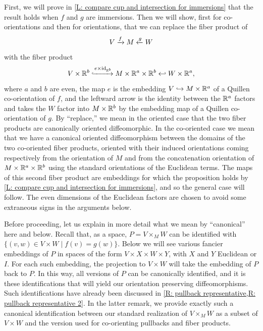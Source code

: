 First, we will prove in \cref{L: compare cup and intersection for immersions} that the result holds when $f$ and $g$ are immersions.
Then we will show, first for co-orientations and then for orientations, that we can replace the fiber product of
$$V \xrightarrow{f} M \xleftarrow{g} W$$
with the fiber product
$$V \times \mathbb{R}^b \xhookrightarrow{e \times \mathrm{id}_{\mathbb{R}^b }} M \times \mathbb{R}^a \times \mathbb{R}^b \hookleftarrow W \times \mathbb{R}^a ,$$
where $a$ and $b$ are even, the map $e$ is the embedding $V \hookrightarrow M \times \mathbb{R}^a $ of a Quillen co-orientation of $f$, and the leftward arrow is the identity between the $\mathbb{R}^a $ factors and takes the $W$ factor into $M \times \mathbb{R}^b $ by the embedding map of a Quillen co-orientation of $g$.
By ``replace,'' we mean in the oriented case that the two fiber products are canonically oriented diffeomorphic.
In the co-oriented case we mean that we have a canonical oriented diffeomorphism
between the domains of the two co-oriented fiber products, oriented with their induced orientations coming respectively from the orientation of $M$ and from the concatenation orientation of $M \times \mathbb{R}^a \times \mathbb{R}^b $ using the standard orientations of the Euclidean terms.
The maps of this second fiber product are embeddings for which the proposition holds by \cref{L: compare cup and intersection for immersions}, and so the general case will follow.
The even dimensions of the Euclidean factors are chosen to avoid some extraneous signs in the arguments below.

Before proceeding, let us explain in more detail what we mean by ``canonical'' here and below.
Recall that, as a space, $P = V \times_M W$ can be identified with $\{(v,w) \in V \times W \mid f(v) = g(w)\}$.
Below we will see various fancier embeddings of $P$ in spaces of the form $V \times X \times W \times Y$, with $X$ and $Y$ Euclidean or $I$.
For each such embedding, the projection to $V \times W$ will take the embedding of $P$ back to $P$.
In this way, all versions of $P$ can be canonically identified, and it is these identifications that will yield our orientation preserving diffeomorphisms.
Such identifications have already been discussed in \cref{R: pullback representative,R: pullback representative 2}.
In the latter remark, we provide exactly such a canonical identification between our standard realization of $V \times_M W$ as a subset of $V \times W$ and the version used for co-orienting pullbacks and fiber products.

